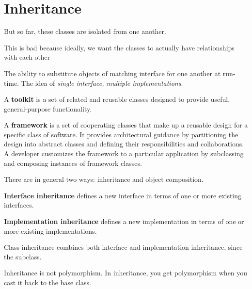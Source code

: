 \section{Inheritance} 

  But so far, these classes are isolated from one another. 


  This is bad because ideally, we want the classes to actually have relationships with each other 

  \begin{definition}[Polymorphism] 
    The ability to substitute objects of matching interface for one another at run-time. 
    The idea of \textit{single interface, multiple implementations}. 
  \end{definition}

  \begin{definition}[Toolkit]
    A \textbf{toolkit} is a set of related and reusable classes designed to provide useful, general-purpose functionality. 
  \end{definition}

  \begin{definition}[Framework]
    A \textbf{framework} is a set of cooperating classes that make up a reusable design for a specific class of software. It provides architectural guidance by partitioning the design into abstract classes and defining their responsibilities and collaborations. A developer customizes the framework to a particular application by subclassing and composing instances of framework classes. 
  \end{definition} 

  There are in general two ways: inheritance and object composition. 

  \begin{definition} 
    \textbf{Interface inheritance} defines a new interface in terms of one or more existing interfaces. 
  \end{definition}

  \begin{definition}
    \textbf{Implementation inheritance} defines a new implementation in terms of one or more existing implementations. 
  \end{definition}  

  Class inheritance combines both interface and implementation inheritance, since the subclass.  

  Inheritance is not polymorphism. In inheritance, you get polymorphism when you cast it back to the base class. 

